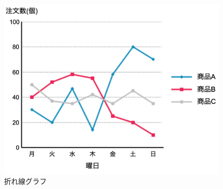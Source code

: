 \begin{figure}[H]
\begin{minipage}[b]{.23\textwidth}
        \includegraphics[keepaspectratio,width=\textwidth]{../../10_UniversalDesign/no2_line_RC_T.png}
    \end{minipage}
    \caption{折れ線グラフ}
\end{figure}
